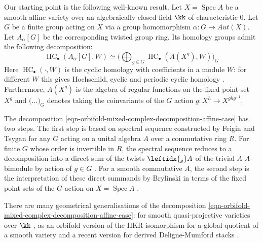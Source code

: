 \documentclass[12pt,a4paper,reqno]{amsart}
\DeclareMathOperator{\spec}{Spec}
\DeclareMathOperator{\hochcx}{{HC}}
\begin{document}
Our starting point is the following well-known result. Let 
$X = \spec A$ be a smooth affine variety over an algebraically
closed field $\kk$ of characteristic $0$. Let $G$ be a finite
group acting on $X$ via a group homomorphism $\alpha: G \to Aut(X)$. 
Let $A_\alpha[G]$ be the corresponding twisted group ring. 
Its homology groups admit the following decomposition:
\begin{equation}
\label{eqn-orbifold-mixed-complex-decomposition-affine-case}
\hochcx_\bullet(A_\alpha[G], W) \simeq 
\big(\bigoplus_{g \in G}  \hochcx_\bullet (A(X^g), W)\big)_G
\end{equation}
Here $\hochcx_\bullet(\cdot, W)$ is the cyclic homology with coefficients
in a module $W$: for different $W$ this gives Hochschild, cyclic and periodic
cyclic homology 
\cite[\S4]{GetzlerJones-TheCyclicHomologyOfCrossedProductAlgebras}. 
Furthermore, $A(X^g)$ is the 
algebra of regular functions on the fixed point set $X^g$ and 
$\big(\ldots\big)_G$ denotes taking the coinvariants of the 
$G$ action $g\colon X^h \rightarrow X^{ghg^{-1}}$. 

The decomposition \eqref{eqn-orbifold-mixed-complex-decomposition-affine-case}
has two steps. The first step is
based on spectral sequence constructed by Feigin and Tsygan 
\cite{FeiginTsygan-CyclicHomologyOfAlgebrasWithQuadraticRelationsUniversalEnvelopingAlgebrasAndGroupAlgebras}
for any $G$ acting on a unital algebra $A$ over a commutative ring $R$.
For finite $G$ whose order is invertible in $R$, 
the spectral sequence reduces to a decomposition into a direct sum of
the twists $\leftidx{_g}A$ of the trivial $A\text{-}A$-bimodule by action 
of $g \in G$
\cite[\S4]{GetzlerJones-TheCyclicHomologyOfCrossedProductAlgebras}.
For a smooth commutative $A$, the second step is the interpretation of
these direct summands by Brylinski in terms of the fixed point sets
of the $G$-action on $X = \spec A$ \cite{Brylinski-CyclicHomologyAndEquivariantTheories}.

There are many geometrical generalisations of the decomposition 
\eqref{eqn-orbifold-mixed-complex-decomposition-affine-case}:
for smooth quasi-projective varieties over $\kk$ 
\cite{Baranovsky-OrbifoldCohomologyAsPeriodicCyclicHomology},  
as an orbifold version of the HKR isomorphism for a global quotient of a smooth variety \cite{ArinkinCaldararuHablicsek-FormalityOfDerivedIntersectionsAndTheOrbifoldHKRIsomorphism}
and a recent version for derived Deligne-Mumford stacks 
\cite{FuPortaSibillaScherotzke-HKRIsomorphismForDerivedDM}.
\end{document}
